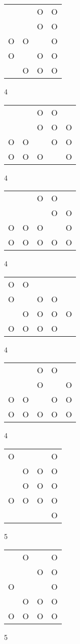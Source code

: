 \begin{tabular}{|m{0.2cm}m{0.2cm}m{0.2cm}m{0.2cm}|}\hline
 & &O&O\\
 & &O&O\\
O&O& &O\\
O& &O&O\\
 &O&O&O\\
\hline\end{tabular}4
\begin{tabular}{|m{0.2cm}m{0.2cm}m{0.2cm}m{0.2cm}m{0.2cm}|}\hline
 & &O&O& \\
 & &O&O&O\\
O&O& &O&O\\
O&O&O& &O\\
\hline\end{tabular}4
\begin{tabular}{|m{0.2cm}m{0.2cm}m{0.2cm}m{0.2cm}m{0.2cm}|}\hline
 & &O&O& \\
 & & &O&O\\
O&O&O& &O\\
O&O&O&O&O\\
\hline\end{tabular}4
\begin{tabular}{|m{0.2cm}m{0.2cm}m{0.2cm}m{0.2cm}m{0.2cm}|}\hline
O&O& & & \\
O& &O&O& \\
 &O&O&O&O\\
O&O&O&O& \\
\hline\end{tabular}4
\begin{tabular}{|m{0.2cm}m{0.2cm}m{0.2cm}m{0.2cm}m{0.2cm}|}\hline
 & &O&O& \\
 & &O& &O\\
O&O& &O&O\\
O&O&O&O&O\\
\hline\end{tabular}4
\begin{tabular}{|m{0.2cm}m{0.2cm}m{0.2cm}m{0.2cm}|}\hline
O& & &O\\
 &O&O&O\\
 &O&O&O\\
O&O&O&O\\
 & & &O\\
\hline\end{tabular}5
\begin{tabular}{|m{0.2cm}m{0.2cm}m{0.2cm}m{0.2cm}|}\hline
 &O& &O\\
 & &O&O\\
O& & &O\\
 &O&O&O\\
O&O&O&O\\
\hline\end{tabular}5
